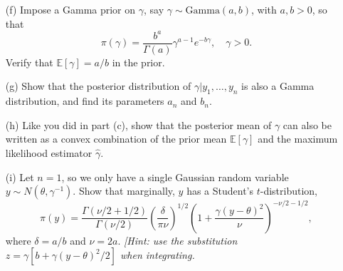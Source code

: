 \documentclass{article}
\begin{document}
\begin{enumerate}
    \item[(f)] Impose a Gamma prior on $\gamma$, say $\gamma \sim \text{Gamma}(a, b)$, with $a, b > 0$, so that
    \[
    \pi(\gamma) = \frac{b^a}{\Gamma(a)} \gamma^{a-1} e^{-b\gamma}, \quad \gamma > 0.
    \]
    Verify that $\mathbb{E}[\gamma] = a/b$ in the prior.
    
    \item[(g)] Show that the posterior distribution of $\gamma | y_1, \dots, y_n$ is also a Gamma distribution, and find its parameters $a_n$ and $b_n$.
    
    \item[(h)] Like you did in part (c), show that the posterior mean of $\gamma$ can also be written as a convex combination of the prior mean $\mathbb{E}[\gamma]$ and the maximum likelihood estimator $\hat{\gamma}$.
    
    \item[(i)] Let $n = 1$, so we only have a single Gaussian random variable $y \sim N(\theta, \gamma^{-1})$. Show that marginally, $y$ has a Student's $t$-distribution,
    \[
    \pi(y) = \frac{\Gamma(\nu/2 + 1/2)}{\Gamma(\nu/2)} \left( \frac{\delta}{\pi \nu} \right)^{1/2} \left( 1 + \frac{\gamma (y - \theta)^2}{\nu} \right)^{-\nu/2-1/2},
    \]
    where $\delta = a/b$ and $\nu = 2a$. \textit{[Hint: use the substitution $z = \gamma[b + \gamma(y - \theta)^2/2]$ when integrating.}
\end{enumerate}
\end{document}
